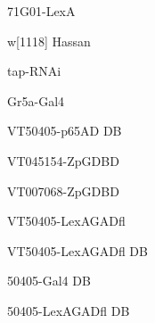 \documentclass[17pt]{extarticle}
\begin{document}
\begin{large}
71G01-LexA \\[0.5em]
\end{large}
\footnotesize
\newpage\vspace*{-0.15cm}
\begin{normalsize}
w[1118] Hassan \\[0.5em]
\end{normalsize}
\footnotesize
\newpage\vspace*{-0.15cm}
\begin{large}
tap-RNAi \\[0.5em]
\end{large}
\footnotesize
\newpage\vspace*{-0.15cm}
\begin{large}
Gr5a-Gal4 \\[0.5em]
\end{large}
\footnotesize
\newpage\vspace*{-0.15cm}
\begin{footnotesize}
VT50405-p65AD DB \\[0.5em]
\end{footnotesize}
\footnotesize
\newpage\vspace*{-0.15cm}
\begin{normalsize}
VT045154-ZpGDBD \\[0.5em]
\end{normalsize}
\footnotesize
\newpage\vspace*{-0.15cm}
\begin{normalsize}
VT007068-ZpGDBD \\[0.5em]
\end{normalsize}
\footnotesize
\newpage\vspace*{-0.15cm}
\begin{footnotesize}
VT50405-LexAGADfl \\[0.5em]
\end{footnotesize}
\footnotesize
\newpage\vspace*{-0.15cm}
\begin{footnotesize}
VT50405-LexAGADfl DB \\[0.5em]
\end{footnotesize}
\footnotesize
\newpage\vspace*{-0.15cm}
\begin{normalsize}
50405-Gal4 DB \\[0.5em]
\end{normalsize}
\footnotesize
\newpage\vspace*{-0.15cm}
\begin{footnotesize}
50405-LexAGADfl DB \\[0.5em]
\end{footnotesize}
\end{document}
